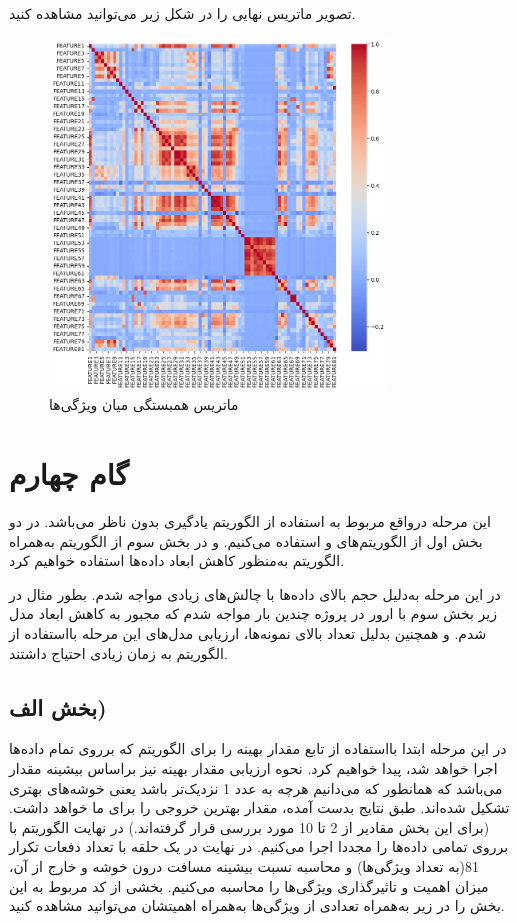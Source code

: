\documentclass{article}
\begin{document}
تصویر ماتریس نهایی را در شکل زیر می‌توانید مشاهده کنید.
\begin{figure}[ht]
        \centering
        \includegraphics[width=0.8\textwidth]{corr-matrix.png}
        \caption{ماتریس همبستگی میان ویژگی‌ها}
        \label{fig:fig4}
    \end{figure}
    


\newpage
\section{گام چهارم}
این مرحله درواقع مربوط به استفاده از الگوریتم یادگیری بدون ناظر می‌باشد. در دو بخش اول از الگوریتم‌های  و  استفاده می‌کنیم. و در بخش سوم از الگوریتم  به‌همراه الگوریتم  به‌منظور کاهش ابعاد داده‌ها استفاده خواهیم کرد.

در این مرحله به‌دلیل حجم بالای داده‌ها با چالش‌های زیادی مواجه شدم. بطور مثال در زیر بخش سوم با ارور  در پروژه  چندین بار مواجه شدم که مجبور به کاهش ابعاد مدل شدم. و همچنین بدلیل تعداد بالای نمونه‌ها، ارزیابی مدل‌های این مرحله بااستفاده از الگوریتم  به زمان زیادی احتیاج داشتند.
\subsection{بخش الف)}
در این مرحله ابتدا بااستفاده از تابع   مقدار بهینه  را برای الگوریتم  که برروی تمام داده‌ها اجرا خواهد شد، پیدا خواهیم کرد. نحوه ارزیابی مقدار بهینه  نیز براساس بیشینه مقدار  می‌باشد که همانطور که می‌دانیم هرچه به عدد 1 نزدیک‌تر باشد یعنی خوشه‌های بهتری تشکیل شده‌اند. طبق نتایج بدست آمده، مقدار  بهترین خروجی را برای ما خواهد داشت. (برای این بخش مقادیر  از 2 تا 10 مورد بررسی قرار گرفته‌اند.)
در نهایت الگوریتم  با  برروی تمامی داده‌ها را مجددا اجرا می‌کنیم. در نهایت در یک حلقه با تعداد دفعات تکرار 81(به تعداد ویژگی‌ها) و محاسبه نسبت بیشینه مسافت درون خوشه و خارج از آن، میزان اهمیت و تاثیرگذاری ویژگی‌ها را محاسبه می‌کنیم.
بخشی از کد مربوط به این بخش را در زیر به‌همراه تعدادی از ویژگی‌ها به‌همراه اهمیتشان می‌توانید مشاهده کنید.
\end{document}
